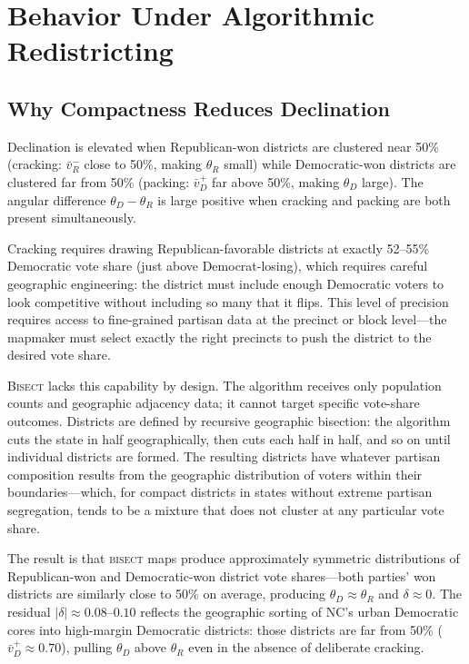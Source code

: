 \section{Behavior Under Algorithmic Redistricting}
\label{sec:behavior}

\subsection{Why Compactness Reduces Declination}

Declination is elevated when Republican-won districts are clustered near 50\%
(cracking: $\bar{v}_R^-$ close to 50\%, making $\theta_R$ small) while Democratic-won
districts are clustered far from 50\% (packing: $\bar{v}_D^+$ far above 50\%,
making $\theta_D$ large). The angular difference $\theta_D - \theta_R$ is large
positive when cracking and packing are both present simultaneously.

Cracking requires drawing Republican-favorable districts at exactly 52--55\% Democratic
vote share (just above Democrat-losing), which requires careful geographic engineering:
the district must include enough Democratic voters to look competitive without including
so many that it flips. This level of precision requires access to fine-grained partisan
data at the precinct or block level---the mapmaker must select exactly the right
precincts to push the district to the desired vote share.

\textsc{Bisect} lacks this capability by design. The algorithm receives only population
counts and geographic adjacency data; it cannot target specific vote-share outcomes.
Districts are defined by recursive geographic bisection: the algorithm cuts the state
in half geographically, then cuts each half in half, and so on until individual districts
are formed. The resulting districts have whatever partisan composition results from the
geographic distribution of voters within their boundaries---which, for compact districts
in states without extreme partisan segregation, tends to be a mixture that does not
cluster at any particular vote share.

The result is that \textsc{bisect} maps produce approximately symmetric distributions
of Republican-won and Democratic-won district vote shares---both parties' won districts
are similarly close to 50\% on average, producing $\theta_D \approx \theta_R$ and
$\delta \approx 0$. The residual $|\delta| \approx 0.08$--$0.10$ reflects the
geographic sorting of NC's urban Democratic cores into high-margin Democratic districts:
those districts are far from 50\% ($\bar{v}_D^+ \approx 0.70$), pulling $\theta_D$
above $\theta_R$ even in the absence of deliberate cracking.

